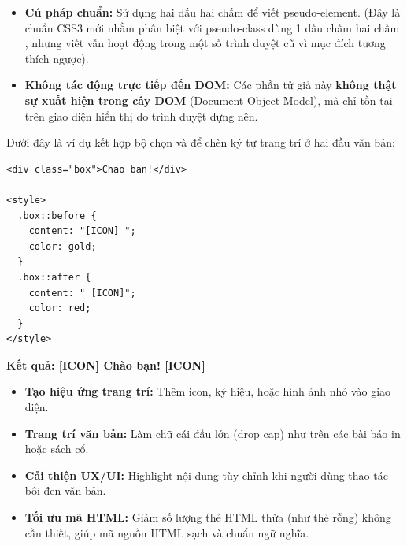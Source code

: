 \begin{warnBox}
\begin{itemize}[leftmargin=1.5em, itemsep=4pt, parsep=0pt]
    \item \textbf{Cú pháp chuẩn:} Sử dụng hai dấu hai chấm \codeinline{::} để viết pseudo-element. (Đây là chuẩn CSS3 mới nhằm phân biệt với pseudo-class dùng 1 dấu chấm hai chấm \codeinline{:}, nhưng viết \codeinline{:} vẫn hoạt động trong một số trình duyệt cũ vì mục đích tương thích ngược).
    \item \textbf{Không tác động trực tiếp đến DOM:} Các phần tử giả này \textbf{không thật sự xuất hiện trong cây DOM} (Document Object Model), mà chỉ tồn tại trên giao diện hiển thị do trình duyệt dựng nên.
\end{itemize}
\end{warnBox}

\begin{conceptBox}
Dưới đây là ví dụ kết hợp bộ chọn  và  để chèn ký tự trang trí ở hai đầu văn bản:
\end{conceptBox}

\begin{codeWindow}
\begin{lstlisting}[language=HTML5]
<div class="box">Chao ban!</div>

<style>
  .box::before {
    content: "[ICON] ";
    color: gold;
  }
  .box::after {
    content: " [ICON]";
    color: red;
  }
</style>
\end{lstlisting}
\end{codeWindow}

\begin{browserWindow}
\sffamily\large\bfseries
\textbf{Kết quả:} [ICON] Chào bạn! [ICON]
\end{browserWindow}

\begin{conceptBox}
\begin{itemize}[leftmargin=1.5em, itemsep=3pt, parsep=0pt]
    \item \textbf{Tạo hiệu ứng trang trí:} Thêm icon, ký hiệu, hoặc hình ảnh nhỏ vào giao diện.
    \item \textbf{Trang trí văn bản:} Làm chữ cái đầu lớn (drop cap) như trên các bài báo in hoặc sách cổ.
    \item \textbf{Cải thiện UX/UI:} Highlight nội dung tùy chỉnh khi người dùng thao tác bôi đen văn bản.
    \item \textbf{Tối ưu mã HTML:} Giảm số lượng thẻ HTML thừa (như thẻ  rỗng) không cần thiết, giúp mã nguồn HTML sạch và chuẩn ngữ nghĩa.
\end{itemize}
\end{conceptBox}

